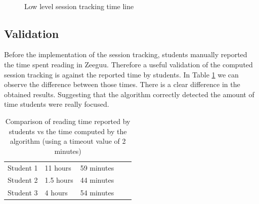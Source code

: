\begin{figure}[!htb]
	\myfloatalign
	 \quad 
		
	 \\
	\caption{Low level session tracking time line}\label{fig:detailed_session_comparison}
\end{figure}


\subsection{Validation}
Before the implementation of the session tracking, students manually reported the time spent reading in Zeeguu. Therefore a useful validation of the computed session tracking is against the reported time by students.
In Table \ref{tb:comparison_read_time} we can observe the difference between those times. There is a clear difference in the obtained results. Suggesting that the algorithm correctly detected the amount of time students were really focused.

\begin{table}[!htb]
	\begin{tabularx}
		{\textwidth}{Xllll}\toprule
		\tableheadline{Student} & 
		\tableheadline{Reported time} &
		\tableheadline{Computed time} \\ 
		\midrule 
		Student 1
		 & 11 hours
		  & 59 minutes
		   \\ 
		\hline 
		Student 2
		 & 1.5 hours
		  & 44 minutes
		   \\ 
		\hline
		Student 3
		 & 4 hours
		  & 54 minutes
		  \\ 
		\hline 
	\end{tabularx} 
	\caption{Comparison of reading time reported by students vs the time computed by the algorithm (using a timeout value of 2 minutes)}\label{tb:comparison_read_time}
\end{table}

